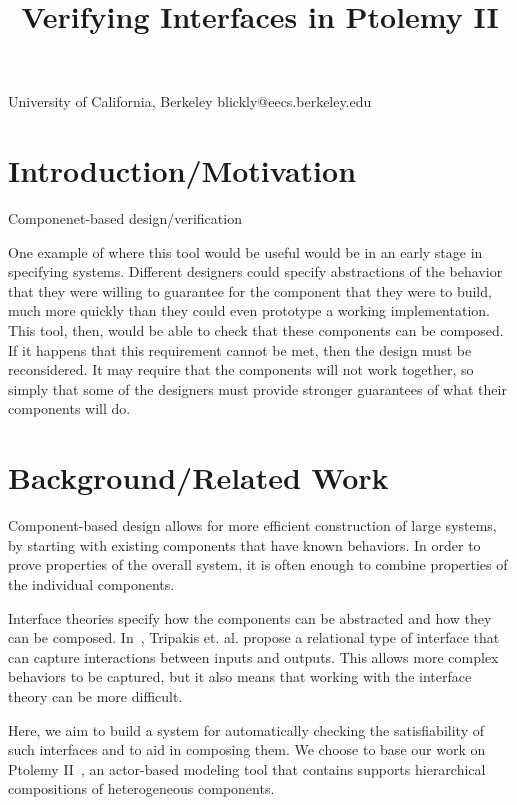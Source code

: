 \documentclass[preprint,11pt,authoryear]{sigplanconf}
\begin{document}
\title{Verifying Interfaces in Ptolemy II}

           {University of California, Berkeley}
           {blickly@eecs.berkeley.edu}

\maketitle

\begin{abstract}
\end{abstract}

\section{Introduction/Motivation}
Componenet-based design/verification

One example of where this tool would be useful would be in an early stage in specifying systems. Different designers could specify abstractions of the behavior that they were willing to guarantee for the component that they were to build, much more quickly than they could even prototype a working implementation.  This tool, then, would be able to check that these components can be composed.  If it happens that this requirement cannot be met, then the design must be reconsidered.  It may require that the components will not work together, so simply that some of the designers must provide stronger guarantees of what their components will do.

\section{Background/Related Work}
Component-based design allows for more efficient construction of large systems, by starting with existing components that have known behaviors.  In order to prove properties of the overall system, it is often enough to combine properties of the individual components.

Interface theories specify how the components can be abstracted and how they can be composed.
In~\cite{realationalInterfaces}, Tripakis et. al. propose a relational type of interface that can capture interactions between inputs and outputs.  This allows more complex behaviors to be captured, but it also means that working with the interface theory can be more difficult.

Here, we aim to build a system for automatically checking the satisfiability of such interfaces and to aid in composing them.  We choose to base our work on Ptolemy II~\cite{ptII}, an actor-based modeling tool that contains supports hierarchical compositions of heterogeneous components.
\end{document}
